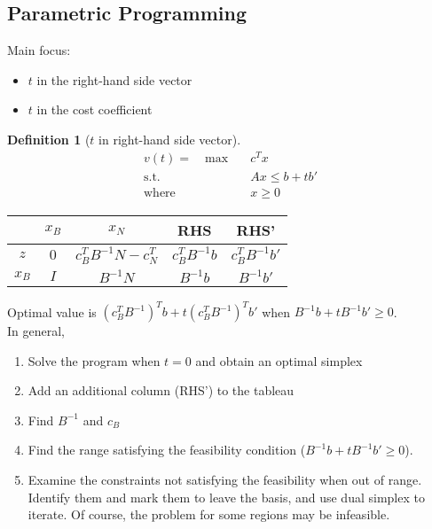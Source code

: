 \documentclass{article}
\theoremstyle{definition}
\newtheorem{definition}{Definition}[section]
\begin{document}
	\subsection{Parametric Programming}
	Main focus:
	\begin{itemize}
	    \item $t$ in the right-hand side vector
	    \item $t$ in the cost coefficient
	\end{itemize}
	\hfill
	
	\begin{definition}[$t$ in right-hand side vector]\hfill
	    \begin{align*}	
			v(t) = \quad\text{max} \quad& c^T x\\
			\text{s.t.} \quad& Ax \leq b + tb' \\
			\text{where} \quad& x \geq 0
    	\end{align*}
    	
    	\begin{center}
        \begin{tabular}{ | c | c | c | c | c | } 
    	    \hline
    		& $x_B$ & $x_N$ & RHS & RHS' \\
    		\hline
    		$z$ & $0$ & $c_B^TB^{-1}N-c_N^T$ & $c_B^TB^{-1}b$ & $c_B^TB^{-1}b'$\\
    		\hline
    		$x_B$ & $I$ & $B^{-1}N$ & $B^{-1}b$ & $B^{-1}b'$ \\
    		\hline
    	\end{tabular}
    	\end{center}
    	\hfill
    	
    	\noindent Optimal value is $(c_B^TB^{-1})^Tb+t(c_B^TB^{-1})^Tb'$ when $B^{-1}b+tB^{-1}b' \geq 0$.\\
    	
    	\noindent In general,
    	\begin{enumerate}
    	    \item Solve the program when $t = 0$ and obtain an optimal simplex
    	    \item Add an additional column (RHS') to the tableau
    	    \item Find $B^{-1}$ and $c_B$
    	    \item Find the range satisfying the feasibility condition ($B^{-1}b + tB^{-1}b' \geq 0$).
    	    \item Examine the constraints not satisfying the feasibility when out of range. Identify them and mark them to leave the basis, and use dual simplex to iterate. Of course, the problem for some regions may be infeasible.
    	\end{enumerate}
    	
	\end{definition}
	
\end{document}
